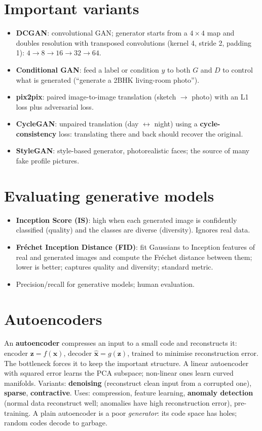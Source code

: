 \section{Important variants}
\begin{itemize}
\item \textbf{DCGAN}: convolutional GAN; generator starts from a $4\times4$ map and doubles resolution with transposed convolutions (kernel 4, stride 2, padding 1):
  $4\to8\to16\to32\to64$.
\item \textbf{Conditional GAN}: feed a label or condition $y$ to both $G$ and $D$ to control what is generated (``generate a 2BHK living-room photo'').
\item \textbf{pix2pix}: paired image-to-image translation (sketch $\to$ photo) with an L1 loss plus adversarial loss.
\item \textbf{CycleGAN}: unpaired translation (day $\leftrightarrow$ night) using a \textbf{cycle-consistency} loss: translating there and back should recover the original.
\item \textbf{StyleGAN}: style-based generator, photorealistic faces; the source of many fake profile pictures.
\end{itemize}

\section{Evaluating generative models}
\begin{itemize}
\item \textbf{Inception Score (IS)}: high when each generated image is confidently classified (quality) and the classes are diverse (diversity). Ignores real data.
\item \textbf{Fr\'echet Inception Distance (FID)}: fit Gaussians to Inception features of real and generated images and compute the Fr\'echet distance between them;
  lower is better; captures quality and diversity; standard metric.
\item Precision/recall for generative models; human evaluation.
\end{itemize}

\section{Autoencoders}
An \textbf{autoencoder} compresses an input to a small code and reconstructs it: encoder $\mathbf z = f(\mathbf x)$, decoder $\hat{\mathbf x} = g(\mathbf z)$, trained to
minimise reconstruction error. The bottleneck forces it to keep the important structure. A linear autoencoder with squared error learns the PCA subspace; non-linear ones
learn curved manifolds.
Variants: \textbf{denoising} (reconstruct clean input from a corrupted one), \textbf{sparse}, \textbf{contractive}. Uses: compression, feature learning, \textbf{anomaly
detection} (normal data reconstruct well; anomalies have high reconstruction error), pre-training.
A plain autoencoder is a poor \emph{generator}: its code space has holes; random codes decode to garbage.

